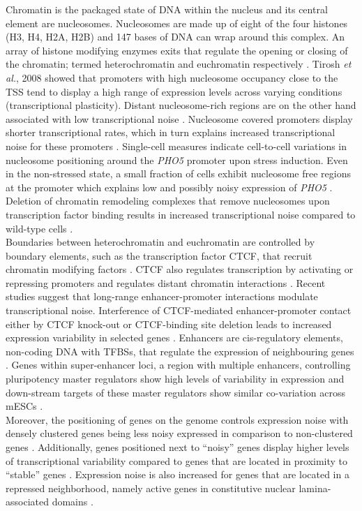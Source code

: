 Chromatin is the packaged state of DNA within the nucleus and its central element are nucleosomes. Nucleosomes are made up of eight of the four histones (H3, H4, H2A, H2B) and 147 bases of DNA can wrap around this complex. An array of histone modifying enzymes exits that regulate the opening or closing of the chromatin; termed heterochromatin and euchromatin respectively \citep{Kouzarides2007}. Tirosh \textit{et al.}, 2008 showed that promoters with high nucleosome occupancy close to the TSS tend to display a high range of expression levels across varying conditions (transcriptional plasticity). Distant nucleosome-rich regions are on the other hand associated with low transcriptional noise \citep{Tirosh2008}. Nucleosome covered promoters display shorter transcriptional rates, which in turn explains increased transcriptional noise for these promoters \cite{Dey2015}. Single-cell measures indicate cell-to-cell variations in nucleosome positioning around the \textit{PHO5} promoter upon stress induction. Even in the non-stressed state, a small fraction of cells exhibit nucleosome free regions at the promoter which explains low and possibly noisy expression of \textit{PHO5} \citep{Small2014}. Deletion of chromatin remodeling complexes that remove nucleosomes upon transcription factor binding results in increased transcriptional noise compared to wild-type cells \citep{Raser2004}. \\ 

Boundaries between heterochromatin and euchromatin are controlled by boundary elements, such as the transcription factor \Gls{CTCF}, that recruit chromatin modifying factors \citep{Kouzarides2007}. CTCF also regulates transcription by activating or repressing promoters and regulates distant chromatin interactions \citep{Kim2015a}. Recent studies suggest that long-range enhancer-promoter interactions modulate transcriptional noise. Interference of CTCF-mediated enhancer-promoter contact either by CTCF knock-out or CTCF-binding site deletion leads to increased expression variability in selected genes \citep{Ren2017}. Enhancers are cis-regulatory elements, non-coding DNA with TFBSs, that regulate the expression of neighbouring genes \citep{Blackwood1998}. Genes within super-enhancer loci, a region with multiple enhancers, controlling pluripotency master regulators show high levels of variability in expression and down-stream targets of these master regulators show similar co-variation across mESCs \citep{Faure2017}.\\

Moreover, the positioning of genes on the genome controls expression noise with densely clustered genes being less noisy expressed in comparison to non-clustered genes \citep{Kustatscher2017}. Additionally, genes positioned next to “noisy” genes display higher levels of transcriptional variability compared to genes that are located in proximity to “stable” genes \citep{Kar2017}. Expression noise is also increased for genes that are located in a repressed neighborhood, namely active genes in constitutive nuclear lamina-associated domains \citep{Faure2017}.\\

